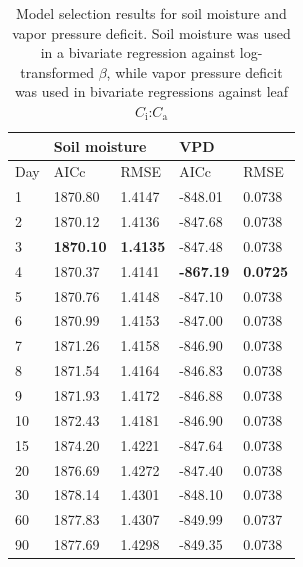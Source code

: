 \newpage
\begin{table}
    \centering
    \caption[Model selection results for soil moisture and vapor pressure deficit]{Model selection results for soil moisture and vapor pressure deficit. Soil moisture was used in a bivariate regression against log-transformed $\beta$, while vapor pressure deficit was used in bivariate regressions against leaf $C_\mathrm{i}$:$C_\mathrm{a}$}
    \label{tab:tab.c4}
        \begin{tabular}{p{2cm}p{2cm}p{2cm}p{2cm}p{2cm}}
            & \multicolumn{2}{l}{Soil moisture} & \multicolumn{2}{l}{VPD} \\
            \hline
            Day & AICc              & RMSE              & AICc              & RMSE   \\
            \hline
            1  & 1870.80            & 1.4147            & -848.01           & 0.0738 \\
            2  & 1870.12            & 1.4136            & -847.68           & 0.0738 \\
            3  & \textbf{1870.10}   & \textbf{1.4135}   & -847.48           & 0.0738 \\
            4  & 1870.37            & 1.4141            & \textbf{-867.19}  & \textbf{0.0725} \\
            5  & 1870.76            & 1.4148            & -847.10           & 0.0738 \\
            6  & 1870.99            & 1.4153            & -847.00           & 0.0738 \\
            7  & 1871.26            & 1.4158            & -846.90           & 0.0738 \\
            8  & 1871.54            & 1.4164            & -846.83           & 0.0738 \\
            9  & 1871.93            & 1.4172            & -846.88           & 0.0738 \\
            10 & 1872.43            & 1.4181            & -846.90           & 0.0738 \\
            15 & 1874.20            & 1.4221            & -847.64           & 0.0738 \\
            20 & 1876.69            & 1.4272            & -847.40           & 0.0738 \\
            30 & 1878.14            & 1.4301            & -848.10           & 0.0738 \\
            60 & 1877.83            & 1.4307            & -849.99           & 0.0737 \\
            90 & 1877.69            & 1.4298            & -849.35           & 0.0738 \\
            \hline
\end{tabular}
\end{table}
\clearpage

